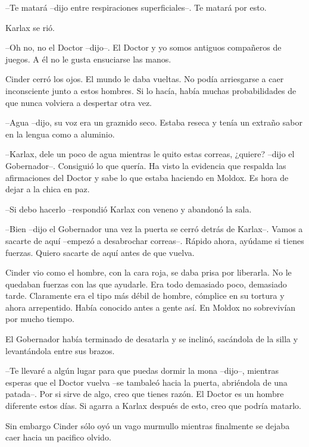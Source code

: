 --Te matará --dijo entre respiraciones superficiales--. Te matará por esto. 



Karlax se rió. 



--Oh no, no el Doctor --dijo--. El Doctor y yo somos antiguos compañeros de juegos. A él no le gusta ensuciarse las manos. 



Cinder cerró los ojos. El mundo le daba vueltas. No podía arriesgarse a caer inconsciente junto a estos hombres. Si lo hacía, había muchas probabilidades de que nunca volviera a despertar otra vez. 



--Agua --dijo, su voz era un graznido seco. Estaba reseca y tenía un extraño sabor en la lengua como a aluminio. 



--Karlax, dele un poco de agua mientras le quito estas correas, ¿quiere? --dijo el Gobernador--. Consiguió lo que quería. Ha visto la evidencia que respalda las afirmaciones del Doctor y sabe lo que estaba haciendo en Moldox. Es hora de dejar a la chica en paz. 



--Si debo hacerlo --respondió Karlax con veneno y abandonó la sala. 



--Bien --dijo el Gobernador una vez la puerta se cerró detrás de Karlax--. Vamos a sacarte de aquí --empezó a desabrochar correas--. Rápido ahora, ayúdame si tienes fuerzas. Quiero sacarte de aquí antes de que vuelva.

 

Cinder vio como el hombre, con la cara roja, se daba prisa por liberarla. No le quedaban fuerzas con las que ayudarle. Era todo demasiado poco, demasiado tarde. Claramente era el tipo más débil de hombre, cómplice en su tortura y ahora arrepentido. Había conocido antes a gente así. En Moldox no sobrevivían por mucho tiempo. 

El Gobernador había terminado de desatarla y se inclinó, sacándola de la silla y levantándola entre sus brazos. 



--Te llevaré a algún lugar para que puedas dormir la mona --dijo--, mientras esperas que el Doctor vuelva --se tambaleó hacia la puerta, abriéndola de una patada--. Por si sirve de algo, creo que tienes razón. El Doctor es un hombre diferente estos días. Si agarra a Karlax después de esto, creo que podría matarlo. 



Sin embargo Cinder sólo oyó un vago murmullo mientras finalmente se dejaba caer hacia un pacifico olvido.



